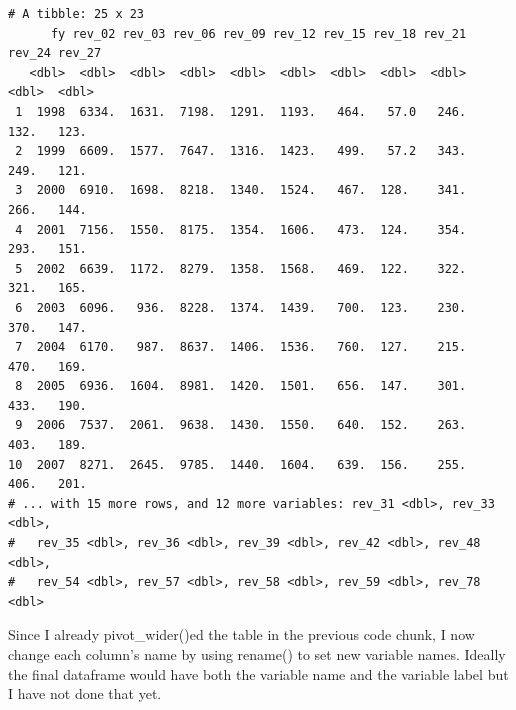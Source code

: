 \documentclass[
  letterpaper,
  DIV=11,
  numbers=noendperiod]{scrreport}
\begin{document}
\begin{verbatim}
# A tibble: 25 x 23
      fy rev_02 rev_03 rev_06 rev_09 rev_12 rev_15 rev_18 rev_21 rev_24 rev_27
   <dbl>  <dbl>  <dbl>  <dbl>  <dbl>  <dbl>  <dbl>  <dbl>  <dbl>  <dbl>  <dbl>
 1  1998  6334.  1631.  7198.  1291.  1193.   464.   57.0   246.   132.   123.
 2  1999  6609.  1577.  7647.  1316.  1423.   499.   57.2   343.   249.   121.
 3  2000  6910.  1698.  8218.  1340.  1524.   467.  128.    341.   266.   144.
 4  2001  7156.  1550.  8175.  1354.  1606.   473.  124.    354.   293.   151.
 5  2002  6639.  1172.  8279.  1358.  1568.   469.  122.    322.   321.   165.
 6  2003  6096.   936.  8228.  1374.  1439.   700.  123.    230.   370.   147.
 7  2004  6170.   987.  8637.  1406.  1536.   760.  127.    215.   470.   169.
 8  2005  6936.  1604.  8981.  1420.  1501.   656.  147.    301.   433.   190.
 9  2006  7537.  2061.  9638.  1430.  1550.   640.  152.    263.   403.   189.
10  2007  8271.  2645.  9785.  1440.  1604.   639.  156.    255.   406.   201.
# ... with 15 more rows, and 12 more variables: rev_31 <dbl>, rev_33 <dbl>,
#   rev_35 <dbl>, rev_36 <dbl>, rev_39 <dbl>, rev_42 <dbl>, rev_48 <dbl>,
#   rev_54 <dbl>, rev_57 <dbl>, rev_58 <dbl>, rev_59 <dbl>, rev_78 <dbl>
\end{verbatim}

Since I already pivot\_wider()ed the table in the previous code chunk, I
now change each column's name by using rename() to set new variable
names. Ideally the final dataframe would have both the variable name and
the variable label but I have not done that yet.
\end{document}
